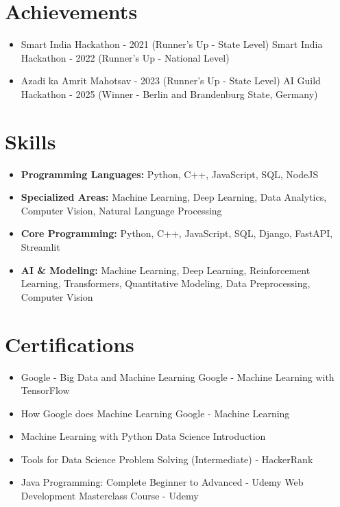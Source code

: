 \documentclass[a4paper,10pt]{article}
\begin{document}
\section*{Achievements}
\begin{itemize}
\item Smart India Hackathon - 2021 (Runner's Up - State Level) \hfill Smart India Hackathon - 2022 (Runner's Up - National Level)
\item Azadi ka Amrit Mahotsav - 2023 (Runner's Up - State Level) \hfill AI Guild Hackathon - 2025 (Winner - Berlin and Brandenburg State, Germany)
\end{itemize}

\section*{Skills}
\begin{itemize}
  \item \textbf{Programming Languages:} Python, C++, JavaScript, SQL, NodeJS
  \item \textbf{Specialized Areas:} Machine Learning, Deep Learning, Data Analytics, Computer Vision, Natural Language Processing
  \item \textbf{Core Programming:} Python, C++, JavaScript, SQL, Django, FastAPI, Streamlit
  \item \textbf{AI \& Modeling:} Machine Learning, Deep Learning, Reinforcement Learning, Transformers, Quantitative Modeling, Data Preprocessing, Computer Vision
\end{itemize}

\section*{Certifications}
\begin{itemize}
\item Google - Big Data and Machine Learning \hfill Google - Machine Learning with TensorFlow
\item How Google does Machine Learning \hfill Google - Machine Learning
\item Machine Learning with Python \hfill Data Science Introduction
\item Tools for Data Science \hfill Problem Solving (Intermediate) - HackerRank
\item Java Programming: Complete Beginner to Advanced - Udemy \hfill Web Development Masterclass Course - Udemy
\end{itemize}
\end{document}

